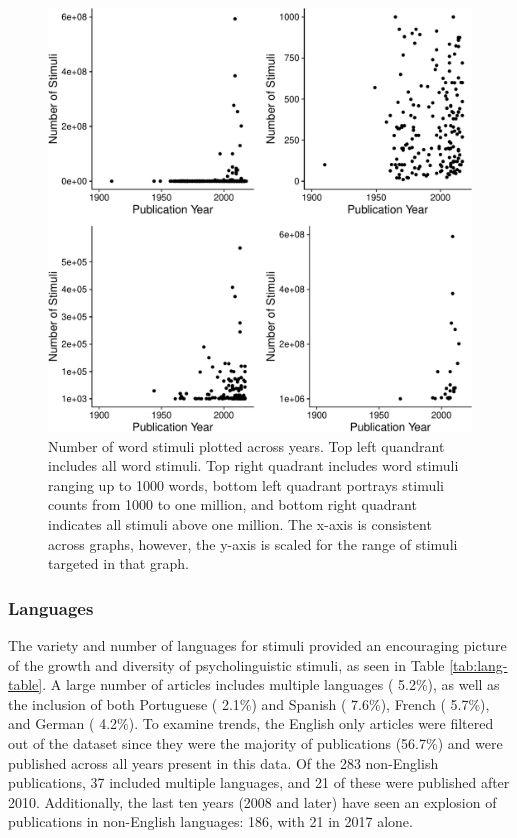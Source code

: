 \documentclass[english,man]{apa6}
\theoremstyle{definition}
\theoremstyle{definition}
\theoremstyle{definition}
\theoremstyle{remark}
\begin{document}
\begin{figure}
\centering
\includegraphics{LAB_files/figure-latex/word-fig-1.pdf}
\caption{\label{fig:word-fig}Number of word stimuli plotted across years.
Top left quandrant includes all word stimuli. Top right quadrant
includes word stimuli ranging up to 1000 words, bottom left quadrant
portrays stimuli counts from 1000 to one million, and bottom right
quadrant indicates all stimuli above one million. The x-axis is
consistent across graphs, however, the y-axis is scaled for the range of
stimuli targeted in that graph.}
\end{figure}

\subsubsection{Languages}\label{languages}

The variety and number of languages for stimuli provided an encouraging
picture of the growth and diversity of psycholinguistic stimuli, as seen
in Table \ref{tab:lang-table}. A large number of articles includes
multiple languages ( 5.2\%), as well as the inclusion of both Portuguese
( 2.1\%) and Spanish ( 7.6\%), French ( 5.7\%), and German ( 4.2\%). To
examine trends, the English only articles were filtered out of the
dataset since they were the majority of publications (56.7\%) and were
published across all years present in this data. Of the 283 non-English
publications, 37 included multiple languages, and 21 of these were
published after 2010. Additionally, the last ten years (2008 and later)
have seen an explosion of publications in non-English languages: 186,
with 21 in 2017 alone.
\end{document}
